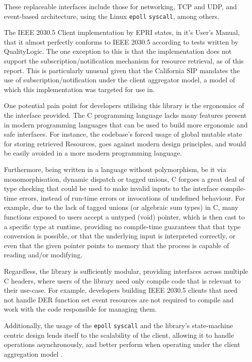 These replaceable interfaces include those for networking, TCP and UDP, and event-based architecture, using the Linux \texttt{epoll} \texttt{syscall}, among others.

The IEEE 2030.5 Client implementation by EPRI states, in it's User's Manual, that it almost perfectly conforms to IEEE 2030.5 according to tests written by QualityLogic.
The one exception to this is that the implementation does not support the subscription/notification mechanism for resource retrieval, as of this report.
This is particularly unusual given that the California SIP mandates the use of subscription/notification under the client aggregator model, a model of which this implementation was targeted for use in.

One potential pain point for developers utilising this library is the ergonomics of the interface provided. The C programming language lacks many features present in modern programming languages that can be used to build more ergonomic and safe interfaces. For instance, the codebase's forced usage of global mutable state for storing retrieved Resources, goes against modern design principles, and would be easily avoided in a more modern programming language. 

Furthermore, being written in a language without polymorphism, be it via monomorphisation, dynamic dispatch or tagged unions, C forgoes a great deal of type checking that could be used to make invalid inputs to the interface compile-time errors, instead of run-time errors or invocations of undefined behaviour. For example, due to the lack of tagged unions (or algebraic sum types) in C, many functions exposed to users accept a untyped (void) pointer, which is then cast to a specific type at runtime, providing no compile-time guarantees that that type conversion is possible, or that the underlying input is interpreted correctly, or even that the given pointer points to memory that the process is capable of reading and/or modifying.

Regardless, the library is sufficiently modular, providing interfaces across multiple C headers, where users of the library need only compile code that is relevant to their use-case. For example, developers building IEEE 2030.5 clients that need not handle DER function set event resources are not required to compile and work with the code responsible for managing them.

Additionally, the usage of the \texttt{epoll} \texttt{syscall} and the library's state-machine centric design lends itself to the scalability of the client, allowing it to handle operations asynchronously, and better perform when operating under the client aggregation model \cite[]{eprimanual}. 

